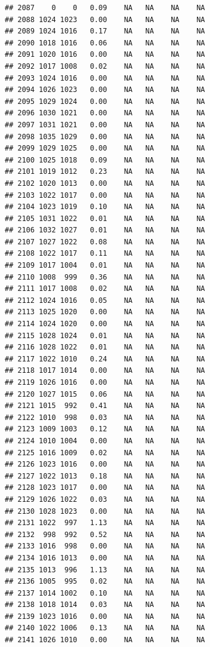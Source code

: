 \documentclass{article}\usepackage{graphicx, color}
\makeatletter
\newenvironment{kframe}{%
 \def\at@end@of@kframe{}%
 \ifinner\ifhmode%
  \def\at@end@of@kframe{\end{minipage}}%
  \begin{minipage}{\columnwidth}%
 \fi\fi%
 \def\FrameCommand##1{\hskip\@totalleftmargin \hskip-\fboxsep
 \colorbox{shadecolor}{##1}\hskip-\fboxsep
     \hskip-\linewidth \hskip-\@totalleftmargin \hskip\columnwidth}%
 \MakeFramed {\advance\hsize-\width
   \@totalleftmargin\z@ \linewidth\hsize
   \@setminipage}}%
 {\par\unskip\endMakeFramed%
 \at@end@of@kframe}
\newenvironment{knitrout}{}{} %
\makeatother
\begin{document}
\begin{knitrout}
\begin{kframe}
\begin{verbatim}
## 2087    0    0   0.09    NA   NA    NA    NA
## 2088 1024 1023   0.00    NA   NA    NA    NA
## 2089 1024 1016   0.17    NA   NA    NA    NA
## 2090 1018 1016   0.06    NA   NA    NA    NA
## 2091 1020 1016   0.00    NA   NA    NA    NA
## 2092 1017 1008   0.02    NA   NA    NA    NA
## 2093 1024 1016   0.00    NA   NA    NA    NA
## 2094 1026 1023   0.00    NA   NA    NA    NA
## 2095 1029 1024   0.00    NA   NA    NA    NA
## 2096 1030 1021   0.00    NA   NA    NA    NA
## 2097 1031 1021   0.00    NA   NA    NA    NA
## 2098 1035 1029   0.00    NA   NA    NA    NA
## 2099 1029 1025   0.00    NA   NA    NA    NA
## 2100 1025 1018   0.09    NA   NA    NA    NA
## 2101 1019 1012   0.23    NA   NA    NA    NA
## 2102 1020 1013   0.00    NA   NA    NA    NA
## 2103 1022 1017   0.00    NA   NA    NA    NA
## 2104 1023 1019   0.10    NA   NA    NA    NA
## 2105 1031 1022   0.01    NA   NA    NA    NA
## 2106 1032 1027   0.01    NA   NA    NA    NA
## 2107 1027 1022   0.08    NA   NA    NA    NA
## 2108 1022 1017   0.11    NA   NA    NA    NA
## 2109 1017 1004   0.01    NA   NA    NA    NA
## 2110 1008  999   0.36    NA   NA    NA    NA
## 2111 1017 1008   0.02    NA   NA    NA    NA
## 2112 1024 1016   0.05    NA   NA    NA    NA
## 2113 1025 1020   0.00    NA   NA    NA    NA
## 2114 1024 1020   0.00    NA   NA    NA    NA
## 2115 1028 1024   0.01    NA   NA    NA    NA
## 2116 1028 1022   0.01    NA   NA    NA    NA
## 2117 1022 1010   0.24    NA   NA    NA    NA
## 2118 1017 1014   0.00    NA   NA    NA    NA
## 2119 1026 1016   0.00    NA   NA    NA    NA
## 2120 1027 1015   0.06    NA   NA    NA    NA
## 2121 1015  992   0.41    NA   NA    NA    NA
## 2122 1010  998   0.03    NA   NA    NA    NA
## 2123 1009 1003   0.12    NA   NA    NA    NA
## 2124 1010 1004   0.00    NA   NA    NA    NA
## 2125 1016 1009   0.02    NA   NA    NA    NA
## 2126 1023 1016   0.00    NA   NA    NA    NA
## 2127 1022 1013   0.18    NA   NA    NA    NA
## 2128 1023 1017   0.00    NA   NA    NA    NA
## 2129 1026 1022   0.03    NA   NA    NA    NA
## 2130 1028 1023   0.00    NA   NA    NA    NA
## 2131 1022  997   1.13    NA   NA    NA    NA
## 2132  998  992   0.52    NA   NA    NA    NA
## 2133 1016  998   0.00    NA   NA    NA    NA
## 2134 1016 1013   0.00    NA   NA    NA    NA
## 2135 1013  996   1.13    NA   NA    NA    NA
## 2136 1005  995   0.02    NA   NA    NA    NA
## 2137 1014 1002   0.10    NA   NA    NA    NA
## 2138 1018 1014   0.03    NA   NA    NA    NA
## 2139 1023 1016   0.00    NA   NA    NA    NA
## 2140 1022 1006   0.13    NA   NA    NA    NA
## 2141 1026 1010   0.00    NA   NA    NA    NA

\end{verbatim}
\end{kframe}
\end{knitrout}
\end{document}
